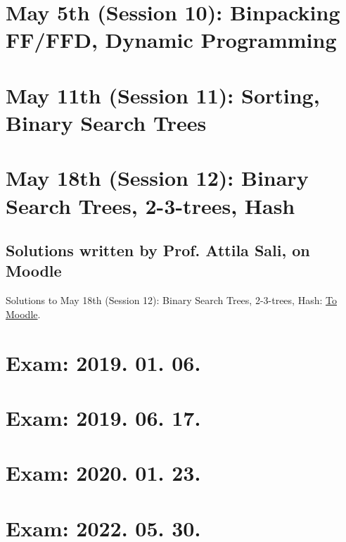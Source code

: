 \documentclass[a4paper]{article}
\begin{document}
\section{May 5th (Session 10): Binpacking FF/FFD, Dynamic Programming}
\pagebreak
\pagebreak
\pagebreak
\pagebreak
\pagebreak
\pagebreak
\pagebreak
\pagebreak
\pagebreak
\pagebreak
\pagebreak
\pagebreak

\section{May 11th (Session 11): Sorting, Binary Search Trees}
\pagebreak

\section{May 18th (Session 12): Binary Search Trees, 2-3-trees, Hash}
\subsection{Solutions written by Prof. Attila Sali, on Moodle}
Solutions to May 18th (Session 12): Binary Search Trees, 2-3-trees, Hash: \href{https://edu.vik.bme.hu/pluginfile.php/325461/mod\_resource/content/1/main.pdf}{To Moodle}.
\pagebreak
\pagebreak

\section{Exam: 2019. 01. 06.}
\pagebreak

\section{Exam: 2019. 06. 17.}
\setcounter{subsection}{3}
\pagebreak

\section{Exam: 2020. 01. 23.}
\setcounter{subsection}{2}
\pagebreak

\section{Exam: 2022. 05. 30.}
\pagebreak
\pagebreak
\pagebreak
\pagebreak
\pagebreak
\pagebreak
\pagebreak
\end{document}
